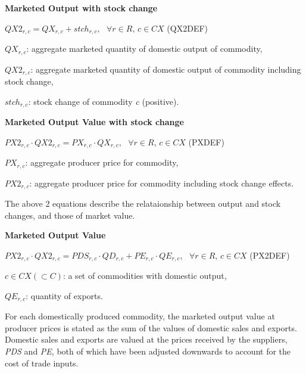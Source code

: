\documentclass[10pt,a4paper,titlepage,dvipdfmx]{book}
\begin{document}
\begin{flushleft}\textbf{Marketed Output with stock change}\end{flushleft}


\begin{center}$QX2_{r,c}=QX_{r,c}+stch_{r,c},\,\,\,\,\forall r\in R,\,c\in CX$ (QX2DEF)
\end{center}

\begin{flushleft}
$QX_{r,c}$: aggregate marketed quantity of domestic output of commodity,

$QX2_{r,c}$: aggregate marketed quantity of domestic output of commodity including stock change,

$stch_{r,c}$: stock change of commodity \textit{c} (positive).
\end{flushleft}

\begin{flushleft}\textbf{Marketed Output Value with stock change}\end{flushleft}


\begin{center}$PX2_{r,c}\cdot QX2_{r,c}=PX_{r,c}\cdot QX_{r,c},\,\,\,\,\forall r\in R,\,c\in CX$ (PXDEF)
\end{center}

\begin{flushleft}
$PX_{r,c}$: aggregate producer price for commodity,

$PX2_{r,c}$: aggregate producer price for commodity including stock change effects.
\end{flushleft}

The above 2 equations describe the relataionship between output and stock changes, and those of market value.

\begin{flushleft}\textbf{Marketed Output Value}\end{flushleft}


\begin{center}$PX2_{r,c}\cdot QX2_{r,c}=PDS_{r,c}\cdot QD_{r,c}+PE_{r,c}\cdot QE_{r,c},\,\,\,\,\forall r\in R,\,c\in CX$ (PX2DEF)
\end{center}

\begin{flushleft}
$c\in CX\left(\subset C\right)$: a set of commodities with domestic output,

$QE_{r,c}$: quantity of exports.
\end{flushleft}
For each domestically produced commodity, the marketed output value at producer prices is stated as the sum of the values of domestic sales and exports. Domestic sales and exports are valued at the prices received by the suppliers, \textit{PDS} and \textit{PE}, both of which have been adjusted downwards to account for the cost of trade inputs. 
\end{document}

